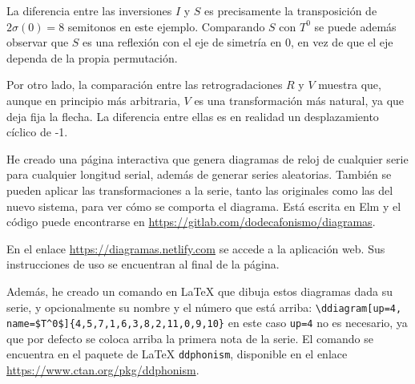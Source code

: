 		La diferencia entre las inversiones $I$ y $S$ es precisamente la transposici\'on de $2\sigma(0)=8$ semitonos en este ejemplo. Comparando $S$ con $T^0$ se puede adem\'as observar que $S$ es una reflexi\'on con el eje de simetr\'ia en 0, en vez de que el eje dependa de la propia permutaci\'on.
		
		\begin{center}
			\begin{multicols}{2}				
				
			\end{multicols}
		\end{center}
	
		Por otro lado, la comparaci\'on entre las retrogradaciones $R$ y $V$ muestra que, aunque en principio m\'as arbitraria, $V$ es una transformaci\'on m\'as natural, ya que deja fija la flecha. La diferencia entre ellas es en realidad un desplazamiento c\'iclico de -1.
		
		\begin{center}
			\begin{multicols}{2}
				\ddiagram[up=4, name=$R$, arrow shift=4]{10,9,0,11,2,8,3,6,1,7,5,4}			
				
				\ddiagram[name=$V$, arrow shift=1]{4,10,9,0,11,2,8,3,6,1,7,5}
			\end{multicols}
		\end{center}

		He creado una p\'agina interactiva que genera diagramas de reloj de cualquier serie para cualquier longitud serial, adem\'as de generar series aleatorias. Tambi\'en se pueden aplicar las transformaciones a la serie, tanto las originales como las del nuevo sistema, para ver c\'omo se comporta el diagrama. Est\'a escrita en Elm y el c\'odigo puede encontrarse en \url{https://gitlab.com/dodecafonismo/diagramas}.
	
		En el enlace \url{https://diagramas.netlify.com} se accede a la aplicaci\'on web. Sus instrucciones de uso se encuentran al final de la p\'agina.
		
		Adem\'as, he creado un comando en \LaTeX{} que dibuja estos diagramas dada su serie, y opcionalmente su nombre y el n\'umero que est\'a arriba: \verb|\ddiagram[up=4, name=$T^0$]{4,5,7,1,6,3,8,2,11,0,9,10}| \textemdash en este caso \verb|up=4| no es necesario, ya que por defecto se coloca arriba la primera nota de la serie. El comando se encuentra en el paquete de \LaTeX{} \texttt{ddphonism}, disponible en el enlace \url{https://www.ctan.org/pkg/ddphonism}.
	
